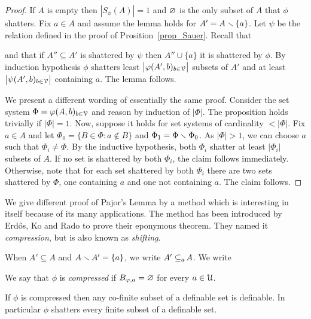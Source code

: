 \documentclass[sputnik.tex]{subfiles}
\begin{document}
\begin{proof}
If $A$ is empty then $|S_\phi(A)|=1$ and $\varnothing$ is the only subset of $A$ that $\phi$ shatters.
Fix $a\in A$ and assume the lemma holds for $A'=A\smallsetminus\{a\}$.
Let $\psi$ be the relation defined in the proof of Prosition~\ref{prop_Sauer}.
Recall that


and that if $A''\subseteq A'$ is shattered by $\psi$ then $A''\cup\{a\}$ it is shattered by $\phi$.
By induction hypothesis $\phi$ shatters least $\big|\varphi(A',b)_{b\in\EuScript V}\big|$ subsets of $A'$ and at least $\big|\psi(A',b)_{b\in\EuScript V}\big|$ containing $a$.
The lemma follows.

We present a different wording of essentially the same proof.
Consider the set system $\Phi=\varphi(A,b)_{b\in\EuScript V}$ and reason by induction of $|\Phi|$.
The proposition holds trivially if $|\Phi|=1$.
Now, suppose it holds for set systems of cardinality $<|\Phi|$.
Fix $a\in A$ and let $\Phi_0=\big\{B\in\Phi : a\notin B\big\}$ and $\Phi_1=\Phi\smallsetminus\Phi_0$.
As $|\Phi|>1$, we can choose $a$ such that $\Phi_i\neq\Phi$.
By the inductive hypothesis, both $\Phi_i$ shatter at least $\big|\Phi_i\big|$ subsets of $A$.
If no set is shattered by both $\Phi_i$, the claim follows immediately.
Otherwise, note that for each set shattered by both $\Phi_i$ there are two sets shattered by $\Phi$, one containing $a$ and one not containing $a$.
The claim follows.
\end{proof}
 
We give different proof of Pajor's Lemma by a method which is interesting in itself because of its many applications.
The method has been introduced by Erd\H{o}s, Ko and Rado to prove their eponymous theorem.
They named it \textit{compression}, but is also known as \textit{shifting}.


When $A'\subseteq A$ and $A\smallsetminus A'=\{a\}$, we write \emph{$A'\subseteq_{a}\kern-1.5pt A$}. We write


We say that $\phi$ is \emph{compressed\/} if $B_{\varphi,a}=\varnothing$ for every $a\in\EuScript U$.

\begin{proposition}\label{prop_compressed} 
If $\phi$ is compressed then any co-finite subset of a definable set is definable.
In particular $\phi$ shatters every finite subset of a definable set.
\end{proposition}
\end{document}
